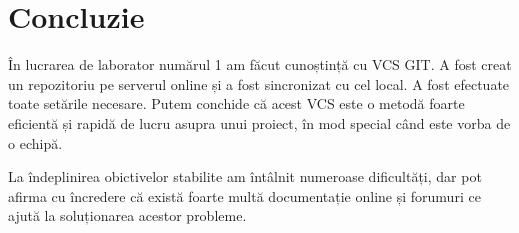 \section*{Concluzie}

	În lucrarea de laborator numărul 1 am făcut cunoștință cu VCS GIT. A fost creat un repozitoriu pe serverul online și a fost sincronizat cu cel local. A fost efectuate toate setările necesare. Putem conchide că acest VCS este o metodă foarte eficientă și rapidă de lucru asupra unui proiect, în mod special când este vorba de o echipă.
	
	La îndeplinirea obictivelor stabilite am întâlnit numeroase dificultăți, dar pot afirma cu încredere că există foarte multă documentație online și forumuri ce ajută la soluționarea acestor probleme.

\clearpage